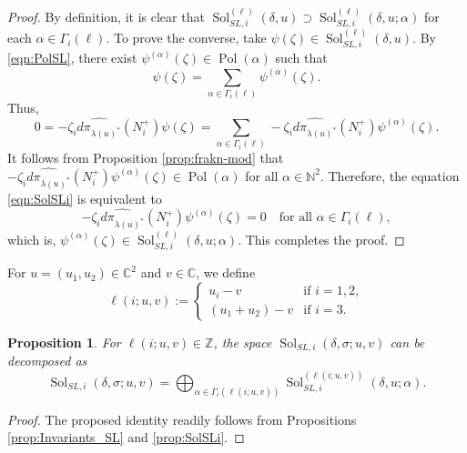 \documentclass[a4paper,11pt,reqno]{amsart}
\newcommand{\0}{{\bf 0}}
\newcommand{\N}{\mathbb{N}}
\newcommand{\Z}{\mathbb{Z}}
\newcommand{\C}{\mathbb{C}}
\newcommand{\1}{{\bf 1}}
\DeclareMathOperator{\Pol}{Pol}
\DeclareMathOperator{\Sol}{Sol}
\theoremstyle{plain}
\newtheorem{proposition}[equation]{Proposition}
\theoremstyle{definition}
\numberwithin{equation}{section}
\theoremstyle{definition}
\begin{document}
\begin{proof}
By definition, it is clear that
$\Sol_{SL,i}^{(\ell)}(\delta,u)  \supset  \Sol_{SL,i}^{(\ell)}(\delta, u;\alpha)$
for each $\alpha \in \Gamma_i(\ell)$. To prove the converse,
take $\psi(\zeta) \in \Sol_{SL,i}^{(\ell)}(\delta,u)$. 
By \eqref{eqn:PolSL}, there exist 
$\psi^{(\alpha)}(\zeta) \in \Pol(\alpha)$ such that
\begin{equation*}
\psi(\zeta) = \sum_{\alpha \in \Gamma_i(\ell)}\psi^{(\alpha)}(\zeta).
\end{equation*}
Thus,
\begin{equation}\label{eqn:SolSLi}
0=-\zeta_i\widehat{d\pi_{\lambda(u)^*}}(N_i^+)\psi(\zeta) 
= \sum_{\alpha \in \Gamma_i(\ell)}
-\zeta_i\widehat{d\pi_{\lambda(u)^*}}(N_i^+)\psi^{(\alpha)}(\zeta).
\end{equation}
It follows from Proposition \ref{prop:frakn-mod} that 
$-\zeta_i\widehat{d\pi_{\lambda(u)^*}}(N_i^+)\psi^{(\alpha)}(\zeta) \in \Pol(\alpha)$ 
for all $\alpha \in \N^2$. Therefore, the equation \eqref{eqn:SolSLi} is 
equivalent to
\begin{equation*}
-\zeta_i\widehat{d\pi_{\lambda(u)^*}}(N_i^+)\psi^{(\alpha)}(\zeta)=0
\quad
\text{for all $\alpha \in \Gamma_i(\ell)$},
\end{equation*}
which is, $\psi^{(\alpha)}(\zeta) \in \Sol_{SL,i}^{(\ell)}(\delta, u;\alpha)$.
This completes the proof.
\end{proof}

For $u=(u_1, u_2) \in \C^2$ and $v \in \C$, we define 
\begin{equation*}
\ell(i;u,v)
:=
\begin{cases}
u_i-v & \text{if $i=1,2$},\\
(u_1+u_2)-v   & \text{if $i=3$}.
\end{cases}
\end{equation*}

\begin{proposition}\label{prop:DSBO_SL}
For $\ell(i;u,v) \in \Z$,  
the space $\Sol_{SL,i}(\delta,\sigma; u, v)$ can be decomposed as
\begin{equation}\label{SolSL2}
\Sol_{SL,i}(\delta,\sigma; u, v)
=\bigoplus_{\alpha\in\Gamma_i(\ell(i;u,v))}
\Sol_{SL,i}^{(\ell(i;u,v))}(\delta, u;\alpha).
\end{equation}
\end{proposition}

\begin{proof}
The proposed identity readily follows from Propositions
\ref{prop:Invariants_SL} and \ref{prop:SolSLi}.
\end{proof}
\end{document}

